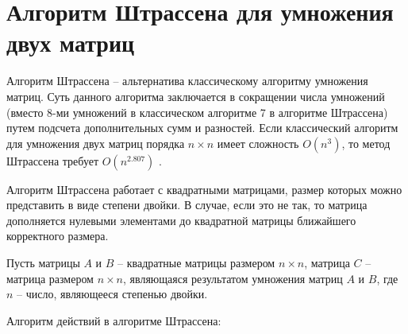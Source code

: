 \section{Алгоритм Штрассена для умножения двух матриц}

Алгоритм Штрассена -- альтернатива классическому алгоритму умножения матриц. Суть данного алгоритма заключается в сокращении числа умножений (вместо 8-ми умножений в классическом алгоритме 7 в алгоритме Штрассена) путем подсчета дополнительных сумм и разностей. Если классический алгоритм для умножения двух матриц порядка $n \times n$ имеет сложность $O(n^3)$, то метод Штрассена требует $O(n^{2.807})$ \cite{stras2}.

Алгоритм Штрассена работает с квадратными матрицами, размер которых можно представить в виде степени двойки. В случае, если это не так, то матрица дополняется нулевыми элементами до квадратной матрицы ближайшего корректного размера.

Пусть матрицы $A$ и $B$ -- квадратные матрицы размером $n \times n$, матрица $C$ -- матрица размером $n \times n$, являющаяся результатом умножения матриц $A$ и $B$, где $n$ -- число, являющееся степенью двойки.

Алгоритм  действий в алгоритме Штрассена:

